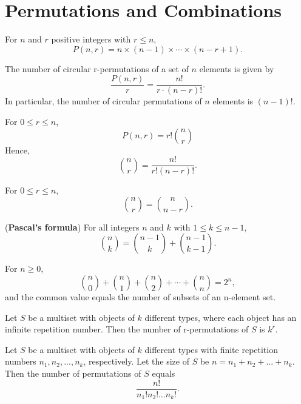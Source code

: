 \chapter{Permutations and Combinations}

\begin{theorem}
    \label{thm:2.2.1}
    For $n$ and $r$ positive integers with $r\leq n$,
    \[P(n,r) = n\times(n-1)\times\cdots\times(n-r+1).\]  
\end{theorem} 

\begin{theorem}
    \label{thm:2.2.2}
    The number of circular r-permutations of a set of $n$ elements is given by 
    \[\frac{P(n,r)}{r}=\frac{n!}{r\cdot(n-r)!}.\]
    In particular, the number of circular permutations of $n$ elements is $(n - 1)!$.
\end{theorem}

\begin{theorem}
    \label{thm:2.3.1} 
    For $0\leq r \leq n$,
    \[P(n,r)=r!\binom{n}{r}\]
    Hence, 
    \[\binom{n}{r} = \frac{n!}{r! (n-r)!}.\]
\end{theorem}

\begin{corollary}
    \label{cor:2.3.2}
    For $0 \leq r \leq n$,
    \[\binom{n}{r} = \binom{n}{n-r}.\]
\end{corollary}

\begin{theorem}
    \label{thm:2.3.3}
    (\textbf{Pascal's formula}) For all integers $n$ and $k$ with $1 \leq k \leq n-1$,
    \[\binom{n}{k} = \binom{n-1}{k} + \binom{n-1}{k-1}.\]
\end{theorem}

\begin{theorem}
    \label{thm:2.3.4}
    For $n \geq 0$,
    \[\binom{n}{0} + \binom{n}{1} + \binom{n}{2} + \cdots + \binom{n}{n} = 2 ^ {n},\]
    and the common value equals the number of subsets of an n-element set.
\end{theorem}

\begin{theorem}
    \label{thm:2.4.1}
    Let $S$ be a multiset with objects of $k$ different types, where each object has an infinite repetition number. Then the number of r-permutations of $S$ is $k^{r}$.
\end{theorem}

\begin{theorem}
    \label{thm:2.4.2}
    Let $S$ be a multiset with objects of $k$ different types with finite repetition numbers $n_1, n_2, ... , n_k$, respectively. Let the size of $S$ be $n = n_1 + n_2 + ... + n_k$. Then the number of permutations of $S$ equals
    \[\frac{n!}{n_1!n_2!\dots n_k!}.\]
\end{theorem}

